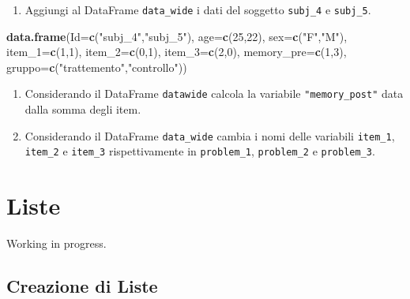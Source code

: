 \documentclass[
]{book}
\newenvironment{Shaded}{\begin{snugshade}}{\end{snugshade}}
\newcommand{\DataTypeTok}[1]{\textcolor[rgb]{0.13,0.29,0.53}{#1}}
\newcommand{\DecValTok}[1]{\textcolor[rgb]{0.00,0.00,0.81}{#1}}
\newcommand{\KeywordTok}[1]{\textcolor[rgb]{0.13,0.29,0.53}{\textbf{#1}}}
\newcommand{\NormalTok}[1]{#1}
\newcommand{\StringTok}[1]{\textcolor[rgb]{0.31,0.60,0.02}{#1}}
\providecommand{\tightlist}{%
  \setlength{\itemsep}{0pt}\setlength{\parskip}{0pt}}
\begin{document}
\begin{enumerate}
\def\labelenumi{\arabic{enumi}.}
\setcounter{enumi}{7}
\tightlist
\item
  Aggiungi al DataFrame \texttt{data\_wide} i dati del soggetto \texttt{subj\_4} e \texttt{subj\_5}.
\end{enumerate}

\begin{Shaded}
\begin{Highlighting}[]
\KeywordTok{data.frame}\NormalTok{(}\DataTypeTok{Id=}\KeywordTok{c}\NormalTok{(}\StringTok{"subj_4"}\NormalTok{,}\StringTok{"subj_5"}\NormalTok{),}
           \DataTypeTok{age=}\KeywordTok{c}\NormalTok{(}\DecValTok{25}\NormalTok{,}\DecValTok{22}\NormalTok{),}
           \DataTypeTok{sex=}\KeywordTok{c}\NormalTok{(}\StringTok{"F"}\NormalTok{,}\StringTok{"M"}\NormalTok{),}
           \DataTypeTok{item_1=}\KeywordTok{c}\NormalTok{(}\DecValTok{1}\NormalTok{,}\DecValTok{1}\NormalTok{),}
           \DataTypeTok{item_2=}\KeywordTok{c}\NormalTok{(}\DecValTok{0}\NormalTok{,}\DecValTok{1}\NormalTok{),}
           \DataTypeTok{item_3=}\KeywordTok{c}\NormalTok{(}\DecValTok{2}\NormalTok{,}\DecValTok{0}\NormalTok{),}
           \DataTypeTok{memory_pre=}\KeywordTok{c}\NormalTok{(}\DecValTok{1}\NormalTok{,}\DecValTok{3}\NormalTok{),}
           \DataTypeTok{gruppo=}\KeywordTok{c}\NormalTok{(}\StringTok{"trattemento"}\NormalTok{,}\StringTok{"controllo"}\NormalTok{))}
\end{Highlighting}
\end{Shaded}

\begin{enumerate}
\def\labelenumi{\arabic{enumi}.}
\setcounter{enumi}{8}
\tightlist
\item
  Considerando il DataFrame \texttt{datawide} calcola la variabile \texttt{"memory\_post"} data dalla somma degli item.
\item
  Considerando il DataFrame \texttt{data\_wide} cambia i nomi delle variabili \texttt{item\_1}, \texttt{item\_2} e \texttt{item\_3} rispettivamente in \texttt{problem\_1}, \texttt{problem\_2} e \texttt{problem\_3}.
\end{enumerate}

\hypertarget{list}{%
\chapter{Liste}\label{list}}

Working in progress.

\hypertarget{creazione-di-liste}{%
\section{Creazione di Liste}\label{creazione-di-liste}}
\end{document}
